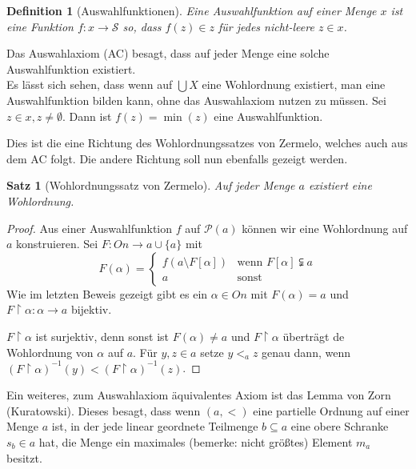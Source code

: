 \documentclass[german]{article}
\theoremstyle{break}
\theoremstyle{def_style}
\newtheorem{definition}{Definition}[section]
\theoremstyle{def_style}
\newtheorem{satz}{Satz}[section]
\theoremstyle{lemma_style}
\newcommand{\Pot}[1]{\mathcal{P}(#1)}
\begin{document}
\begin{definition}[Auswahlfunktionen]
	Eine \textit{Auswahlfunktion} auf einer Menge $x$ ist eine Funktion $f:x\to\mathcal{S}$ so, dass $f(z)\in z$ für jedes nicht-leere $z\in x$.
\end{definition}

Das Auswahlaxiom (AC) besagt, dass auf jeder Menge eine solche Auswahlfunktion existiert.\\

Es lässt sich sehen, dass wenn auf $\bigcup X$ eine Wohlordnung existiert, man eine Auswahlfunktion bilden kann, ohne das Auswahlaxiom nutzen zu müssen. Sei $z\in x, z\neq\emptyset$. Dann ist $f(z)=\min(z)$ eine Auswahlfunktion. 

Dies ist die eine Richtung des Wohlordnungssatzes von Zermelo, welches auch aus dem AC folgt. Die andere Richtung soll nun ebenfalls gezeigt werden.

\begin{satz}[Wohlordnungssatz von Zermelo]
	Auf jeder Menge $a$ existiert eine Wohlordnung.
\end{satz}
\begin{proof}
	Aus einer Auswahlfunktion $f$ auf $\Pot{a}$ können wir eine Wohlordnung auf $a$ konstruieren. Sei $F:On\to a\cup \{a\}$ mit
	$$
	F(\alpha)=\begin{cases}
		f(a\setminus F[\alpha]) & \text{wenn } F[\alpha]\subsetneqq a \\
		a & \text{sonst}
	\end{cases}
	$$
	Wie im letzten Beweis gezeigt gibt es ein $\alpha\in On$ mit $F(\alpha)=a$ und $F\upharpoonright \alpha:\alpha\to a$ bijektiv.
	
	$F\upharpoonright\alpha$ ist surjektiv, denn sonst ist $F(\alpha)\neq a$ und $F\upharpoonright\alpha$ überträgt de Wohlordnung von $\alpha$ auf $a$. Für $y,z\in a$ setze $y <_a z$ genau dann, wenn $(F\upharpoonright\alpha)^{-1}(y) < (F\upharpoonright\alpha)^{-1}(z)$.
\end{proof}

Ein weiteres, zum Auswahlaxiom äquivalentes Axiom ist das Lemma von Zorn (Kuratowski).
Dieses besagt, dass wenn $(a,<)$ eine partielle Ordnung auf einer Menge $a$ ist, in der jede linear geordnete Teilmenge $b\subseteq a$ eine obere Schranke $s_b\in a$ hat, die Menge ein maximales (bemerke: nicht größtes) Element $m_a$ besitzt.
\end{document}
